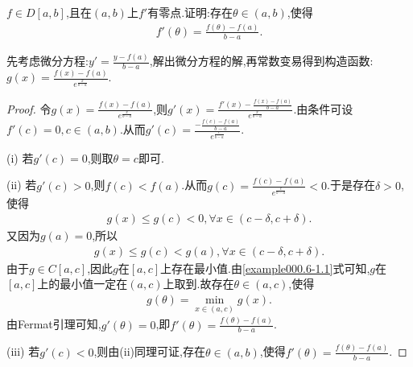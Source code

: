 \documentclass[../../main.tex]{subfiles}%
\begin{document}
\begin{example}
$f\in D[a,b]$,且在$(a,b)$上$f'$有零点.证明:存在$\theta \in (a,b)$,使得
\begin{align*}
f'(\theta) = \frac{f(\theta) -f(a)}{b-a}.
\end{align*}
\end{example}
\begin{remark}
先考虑微分方程:$y' =\frac{y-f(a)}{b-a}$,解出微分方程的解,再常数变易得到构造函数:$g(x) =\frac{f(x) -f(a)}{e^{\frac{x}{b-a}}}$.
\end{remark}
\begin{proof}

令$g(x) =\frac{f(x) -f(a)}{e^{\frac{x}{b-a}}}$,则$g'(x) =\frac{f'(x) -\frac{f(x) -f(a)}{b-a}}{e^{\frac{x}{b-a}}}$.由条件可设$f'(c) =0,c\in (a,b)$.从而$g'(c) =\frac{-\frac{f(c) -f(a)}{b-a}}{e^{\frac{c}{b-a}}}$.

(i) 若$g'(c) =0$,则取$\theta =c$即可.

(ii) 若$g'(c) >0$,则$f(c) <f(a)$.从而$g(c) =\frac{f(c) -f(a)}{e^{\frac{c}{b-a}}}<0$.于是存在$\delta >0$,使得
\begin{align*}
g(x) \leqslant g(c) <0,\forall x\in (c-\delta ,c+\delta).
\end{align*}
又因为$g(a) =0$,所以
\begin{align}
g(x) \leqslant g(c) <g(a),\forall x\in (c-\delta ,c+\delta).\label{example000.6-1.1}
\end{align}
由于$g\in C[a,c]$,因此$g$在$[a,c]$上存在最小值.由\eqref{example000.6-1.1}式可知,$g$在$[a,c]$上的最小值一定在$(a,c)$上取到.故存在$\theta \in (a,c)$,使得
\begin{align*}
g(\theta) =\min_{x\in (a,c)}g(x).
\end{align*}
由Fermat引理可知,$g'(\theta) =0$,即$f'(\theta) =\frac{f(\theta) -f(a)}{b-a}$.

(iii) 若$g'(c) <0$,则由(ii)同理可证,存在$\theta \in (a,b)$,使得$f'(\theta) =\frac{f(\theta) -f(a)}{b-a}$.

\end{proof}
\end{document}
